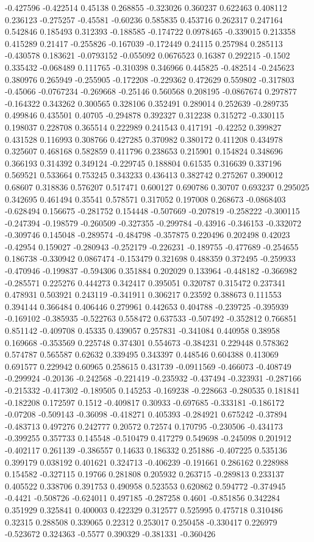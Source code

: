 -0.427596 -0.422514 0.45138 0.268855 -0.323026 0.360237 0.622463 0.408112 0.236123 -0.275257 -0.45581 -0.60236 0.585835 0.453716 0.262317 0.247164 0.542846 0.185493 0.312393 -0.188585 -0.174722 0.0978465 -0.339015 0.213358 0.415289 0.21417 -0.255826 -0.167039 -0.172449 0.24115 0.257984 0.285113 -0.430578 0.183621 -0.0793152 -0.055092 0.0676523 0.16387 0.292215 -0.1502 0.335432 -0.068489 0.111765 -0.310398 0.346966 0.445825 -0.482514 -0.245623 0.380976 0.265949 -0.255905 -0.172208 -0.229362 0.472629 0.559802 -0.317803 -0.45066 -0.0767234 -0.269668 -0.25146 0.560568 0.208195 -0.0867674 0.297877 -0.164322 0.343262 0.300565 0.328106 0.352491 0.289014 0.252639 -0.289735 0.499846 0.435501 0.40705 -0.294878 0.392327 0.312238 0.315272 -0.330115 0.198037 0.228708 0.365514 0.222989 0.241543 0.417191 -0.42252 0.399827 0.431528 0.116993 0.308766 0.427285 0.370982 0.380172 0.411208 0.434978 0.325607 0.468168 0.582859 0.411796 0.238653 0.215901 0.154824 0.348696 0.366193 0.314392 0.349124 -0.229745 0.188804 0.61535 0.316639 0.337196 0.569521 0.533664 0.753245 0.343233 0.436413 0.382742 0.275267 0.390012 0.68607 0.318836 0.576207 0.517471 0.600127 0.690786 0.30707 0.693237 0.295025 0.342695 0.461494 0.35541 0.578571 0.317052 0.197008 0.268673 -0.0868403 -0.628494 0.156675 -0.281752 0.154448 -0.507669 -0.207819 -0.258222 -0.300115 -0.247394 -0.198579 -0.260509 -0.327355 -0.299784 -0.43916 -0.346153 -0.332072 -0.309746 0.145048 -0.289574 -0.484798 -0.357875 0.220496 0.202498 0.42023 -0.42954 0.159027 -0.280943 -0.252179 -0.226231 -0.189755 -0.477689 -0.254655 0.186738 -0.330942 0.0867474 -0.153479 0.321698 0.488359 0.372495 -0.259933 -0.470946 -0.199837 -0.594306 0.351884 0.202029 0.133964 -0.448182 -0.366982 -0.285571 0.225276 0.444273 0.342417 0.395051 0.320787 0.315472 0.237341 0.478931 0.503921 0.243119 -0.341911 0.306217 0.23592 0.388673 0.111553 0.394144 0.366484 0.406446 0.279961 0.442653 0.404788 -0.239725 -0.395939 -0.169102 -0.385935 -0.522763 0.558472 0.637533 -0.507492 -0.352812 0.766851 0.851142 -0.409708 0.45335 0.439057 0.257831 -0.341084 0.440958 0.38958 0.169668 -0.353569 0.225748 0.374301 0.554673 -0.384231 0.229448 0.578362 0.574787 0.565587 0.62632 0.339495 0.343397 0.448546 0.604388 0.413069 0.691577 0.229942 0.60965 0.258615 0.431739 -0.0911569 -0.466073 -0.408749 -0.299924 -0.20136 -0.242568 -0.221419 -0.235932 -0.437494 -0.323931 -0.287166 -0.215332 -0.417302 -0.189505 0.145253 -0.169238 -0.228663 -0.280535 0.181841 -0.182208 0.172597 0.1512 -0.409817 0.30933 -0.697685 -0.333181 -0.186172 -0.07208 -0.509143 -0.36098 -0.418271 0.405393 -0.284921 0.675242 -0.37894 -0.483713 0.497276 0.242777 0.20572 0.72574 0.170795 -0.230506 -0.434173 -0.399255 0.357733 0.145548 -0.510479 0.417279 0.549698 -0.245098 0.201912 -0.402117 0.261139 -0.386557 0.14633 0.186332 0.251886 -0.407225 0.535136 0.399179 0.038192 0.401621 0.324713 -0.406239 -0.191661 0.286162 0.228988 0.154582 -0.327115 0.19766 0.281808 0.205932 0.263715 -0.289813 0.233137 0.405522 0.338706 0.391753 0.490958 0.523553 0.620862 0.594772 -0.374945 -0.4421 -0.508726 -0.624011 0.497185 -0.287258 0.4601 -0.851856 0.342284 0.351929 0.325841 0.400003 0.422329 0.312577 0.525995 0.475718 0.310486 0.32315 0.288508 0.339065 0.22312 0.253017 0.250458 -0.330417 0.226979 -0.523672 0.324363 -0.5577 0.390329 -0.381331 -0.360426 